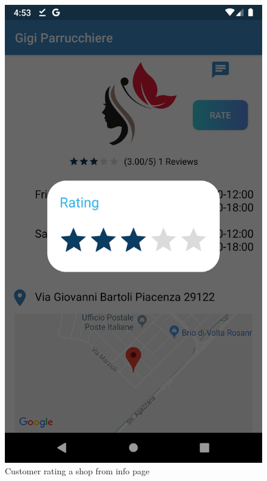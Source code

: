 \begin{figure}[h]
\centering
  \includegraphics[height=.4\textheight, keepaspectratio=true]{Img/Screens/Customer_Home_Rate}
\caption{Customer rating a shop from info page}
\end{figure}

